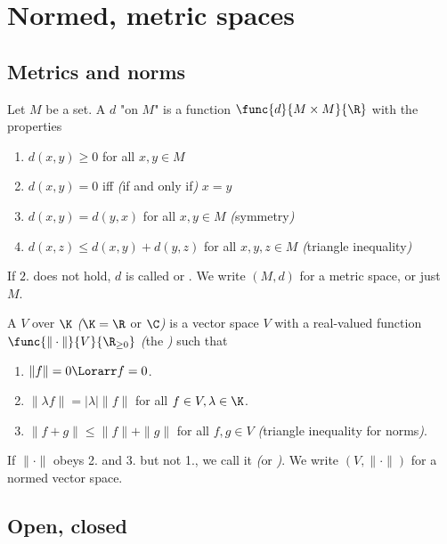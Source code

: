 \section{Normed, metric spaces}

\subsection{Metrics and norms}

\begin{definition}[Metric]\label{i.1}
Let $M$ be a set. A  $d$ "on $M$" is a function $\func{d}{M\times M}{\R}$ with the properties
\begin{enumerate}
\item $d(x,y)\geq0$ for all $x,y\in M$
\item $d(x,y)=0$ iff \emph{(}if and only if\emph{)} $x=y$
\item $d(x,y)=d(y,x)$ for all $x,y\in M$ \emph{(}symmetry\emph{)}
\item $d(x,z)\leq d(x,y)+d(y,z)$ for all $x,y,z\in M$ \emph{(}triangle inequality\emph{)}
\end{enumerate}
If $2.$ does not hold, $d$ is called  or . 
We write $(M,d)$ for a metric space, or just $M$.
\end{definition}

\begin{definition}\label{i.2}
A  $V$ over $\K$ \emph{(}$\K=\R$ or $\C$\emph{)} is a vector space $V$ 
with a real-valued function $\func{\|\cdot\|}{V}{\R_{\geq0}}$ \emph{(}the \emph{)} such that
\begin{enumerate}
    \item $\|f\|=0\Lorarr f=0$.
    \item $\|\lambda f\|=|\lambda|\|f\|$ for all $f\in V,\lambda\in\K$.
    \item $\|f+g\|\leq\|f\|+\|g\|$ for all $f,g\in V$ \emph{(}triangle inequality for norms\emph{)}.
\end{enumerate}
If $\|\cdot\|$ obeys 2. and 3. but not 1., we call it  \emph{(}or \emph{)}. 
We write $(V,\|\cdot\|)$ for a normed vector space.
\end{definition}

\subsection{Open, closed}

